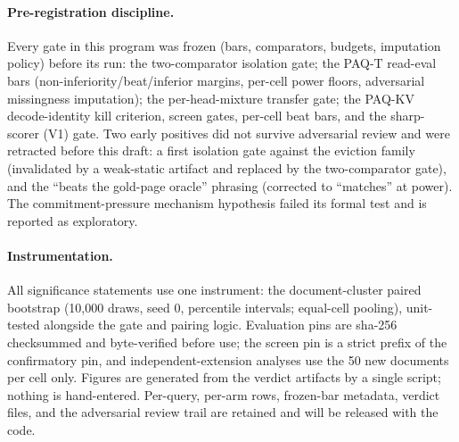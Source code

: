 \documentclass[letterpaper]{article} %
\newcommand{\paqt}{\textsc{PAQ-T}}
\newcommand{\paqc}{\textsc{PAQ-KV}}
\begin{document}
\paragraph{Pre-registration discipline.} Every gate in this program was frozen (bars, comparators, budgets, imputation policy) before its run: the two-comparator isolation gate; the \paqt{} read-eval bars (non-inferiority/beat/inferior margins, per-cell power floors, adversarial missingness imputation); the per-head-mixture transfer gate; the \paqc{} decode-identity kill criterion, screen gates, per-cell beat bars, and the sharp-scorer (V1) gate. Two early positives did not survive adversarial review and were retracted before this draft: a first isolation gate against the eviction family (invalidated by a weak-static artifact and replaced by the two-comparator gate), and the ``beats the gold-page oracle'' phrasing (corrected to ``matches'' at power). The commitment-pressure mechanism hypothesis failed its formal test and is reported as exploratory.

\paragraph{Instrumentation.} All significance statements use one instrument: the document-cluster paired bootstrap (10{,}000 draws, seed 0, percentile intervals; equal-cell pooling), unit-tested alongside the gate and pairing logic. Evaluation pins are sha-256 checksummed and byte-verified before use; the screen pin is a strict prefix of the confirmatory pin, and independent-extension analyses use the 50 new documents per cell only. Figures are generated from the verdict artifacts by a single script; nothing is hand-entered. Per-query, per-arm rows, frozen-bar metadata, verdict files, and the adversarial review trail are retained and will be released with the code.
\end{document}
